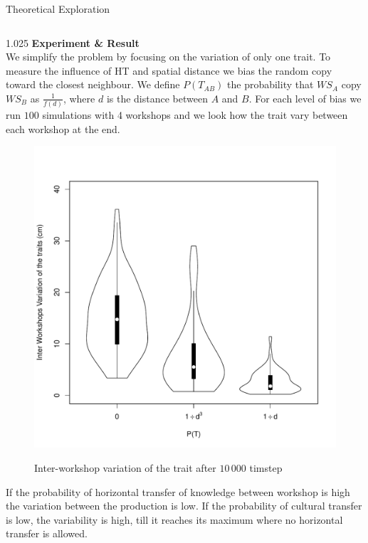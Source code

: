 \documentclass[final]{beamer}
\newlength{\onecolwid}
\newlength{\twocolwid}
\begin{document}
\begin{frame}[t]
\begin{columns}[t]
\begin{column}{\twocolwid}
\begin{block}{Theoretical Exploration}
\begin{columns}[t,totalwidth=\twocolwid]
\begin{column}{1.025\onecolwid}
{\textbf{Experiment \& Result}}\\
We simplify the problem by focusing on the variation of only one trait. To measure the influence of HT and spatial distance we bias the random copy toward the closest neighbour. We define $P(T_{AB})$ the probability that $WS_A$ copy $WS_B$ as $\frac{1}{f(d)}$, where $d$ is the distance between $A$ and $B$.
For each level of bias we run $100$ simulations with 4 workshops and we look how the trait vary between each workshop at the end.\vspace{-.7cm}


    \begin{figure}[h!]
    \centering
\singlespace
\caption{Inter-workshop variation of the trait after $10\,000$ timstep}\vspace{-1.6cm}
	
%	    
	\includegraphics[width=0.5\linewidth]{images/interworkshopvar.pdf}
	\label{fig:resmod}
    \end{figure}

If the probability of horizontal transfer of knowledge between workshop is high the variation between the production is low. If the probability of cultural transfer is low, the variability is high, till it reaches its maximum where no horizontal transfer is allowed.

    
\end{column}
\end{columns}


\end{block}
\end{column}
\end{columns}
\end{frame}
\end{document}
